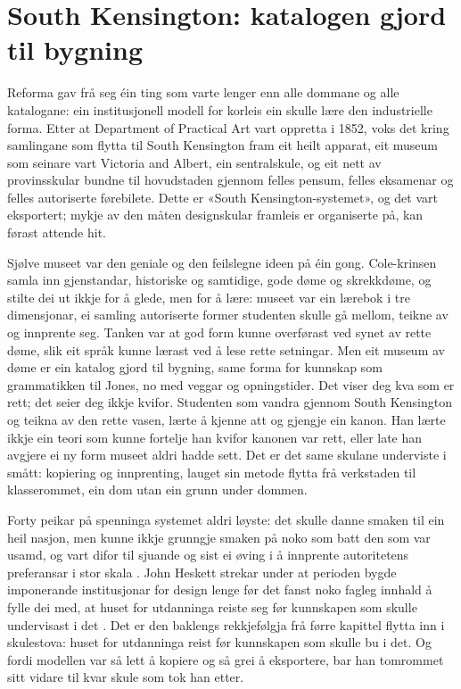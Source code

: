 \section{South Kensington: katalogen gjord til bygning}

Reforma gav frå seg éin ting som varte lenger enn alle dommane og alle katalogane: ein institusjonell modell for korleis ein skulle lære den industrielle forma. Etter at Department of Practical Art vart oppretta i 1852, voks det kring samlingane som flytta til South Kensington fram eit heilt apparat, eit museum som seinare vart Victoria and Albert, ein sentralskule, og eit nett av provinsskular bundne til hovudstaden gjennom felles pensum, felles eksamenar og felles autoriserte førebilete. Dette er «South Kensington-systemet», og det vart eksportert; mykje av den måten designskular framleis er organiserte på, kan førast attende hit.

Sjølve museet var den geniale og den feilslegne ideen på éin gong. Cole-krinsen samla inn gjenstandar, historiske og samtidige, gode døme og skrekkdøme, og stilte dei ut ikkje for å glede, men for å lære: museet var ein lærebok i tre dimensjonar, ei samling autoriserte former studenten skulle gå mellom, teikne av og innprente seg. Tanken var at god form kunne overførast ved synet av rette døme, slik eit språk kunne lærast ved å lese rette setningar. Men eit museum av døme er ein katalog gjord til bygning, same forma for kunnskap som grammatikken til Jones, no med veggar og opningstider. Det viser deg kva som er rett; det seier deg ikkje kvifor. Studenten som vandra gjennom South Kensington og teikna av den rette vasen, lærte å kjenne att og gjengje ein kanon. Han lærte ikkje ein teori som kunne fortelje han kvifor kanonen var rett, eller late han avgjere ei ny form museet aldri hadde sett. Det er det same skulane underviste i smått: kopiering og innprenting, lauget sin metode flytta frå verkstaden til klasserommet, ein dom utan ein grunn under dommen.

Forty peikar på spenninga systemet aldri løyste: det skulle danne smaken til ein heil nasjon, men kunne ikkje grunngje smaken på noko som batt den som var usamd, og vart difor til sjuande og sist ei øving i å innprente autoritetens preferansar i stor skala \autocite{forty1986}. John Heskett strekar under at perioden bygde imponerande institusjonar for design lenge før det fanst noko fagleg innhald å fylle dei med, at huset for utdanninga reiste seg før kunnskapen som skulle undervisast i det \autocite{heskett1980}. Det er den baklengs rekkjefølgja frå førre kapittel flytta inn i skulestova: huset for utdanninga reist før kunnskapen som skulle bu i det. Og fordi modellen var så lett å kopiere og så grei å eksportere, bar han tomrommet sitt vidare til kvar skule som tok han etter.

